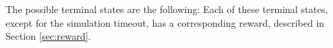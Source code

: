 	The possible terminal states are the following:
	Each of these terminal states, except for the simulation timeout, has a corresponding reward, described in Section \ref{sec:reward}. 
	
